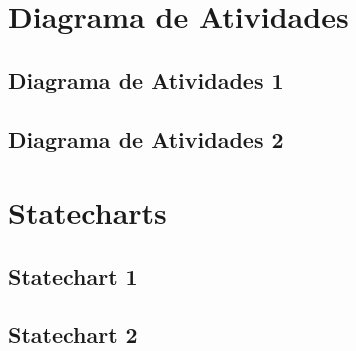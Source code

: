 \documentclass[brazil,times]{abnt}
\begin{document}
\section{Diagrama de Atividades}
\subsection{Diagrama de Atividades 1}


\subsection{Diagrama de Atividades 2}


\section{Statecharts}
\subsection{Statechart 1}


\subsection{Statechart 2}
\end{document}
